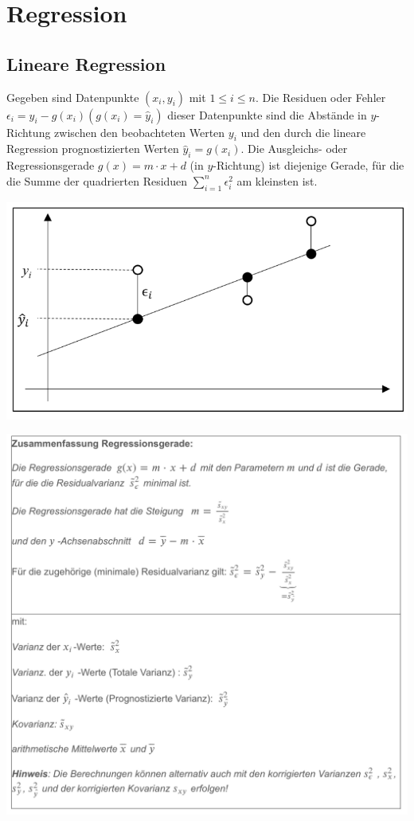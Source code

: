 \section{Regression}
\label{sec:regression}
\subsection{Lineare Regression}
\label{sec:lineare_regression}
Gegeben sind Datenpunkte $(x_i, y_i)$ mit $1 \leq i \leq n$. Die Residuen oder Fehler $\epsilon_i = y_i - g(x_i) (g(x_i)=\hat{y}_i)$ dieser Datenpunkte sind
die Abstände in $y$-Richtung zwischen den beobachteten Werten $y_i$ und den durch die lineare Regression prognostizierten Werten $\hat{y}_i = g(x_i)$.
Die Ausgleichs- oder Regressionsgerade $g(x) = m \cdot x + d$ (in $y$-Richtung) ist diejenige Gerade, für die die Summe der quadrierten Residuen 
$\sum_{i=1}^n \epsilon_i^2$ am kleinsten ist.
\begin{center}
    \includegraphics[width=0.5\linewidth]{images/regression.png}
\end{center}
\begin{center}
    \includegraphics[width=1\linewidth]{images/regression2.png}
\end{center}
